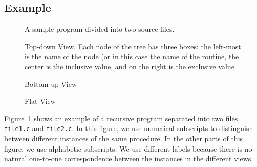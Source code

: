 
\subsection{Example}

\begin{figure}[t]
\caption{A sample program divided into two source files.}
\label{fig:source-files}
\end{figure}



\begin{figure}[t]
\caption{Top-down View. Each node of the tree has three boxes: the left-most is the name of the node (or in this case the name of the routine, the center is the inclusive value, and on the right is the exclusive value.}
\label{fig:cct}
\end{figure}

\begin{figure}
\caption{Bottom-up View}
\label{fig:metrics-callers}
\end{figure}

\begin{figure}
\caption{Flat View}
\label{fig:metrics-flat}
\end{figure}


Figure~\ref{fig:source-files} shows an example of a recursive program separated into two files, \texttt{file1.c} and \texttt{file2.c}.
In this figure, we use numerical subscripts to distinguish between different instances of the same procedure.
In the other parts of this figure, we use alphabetic subscripts.
We use different labels because there is no natural one-to-one correspondence between the instances in the different views.

